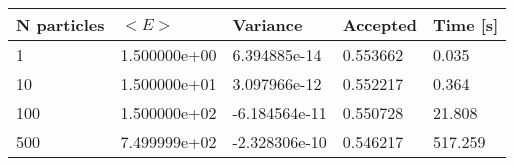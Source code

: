 \begin{table}[h!]
\begin{tabular}{|l|l|l|l|l|}
\hline 
N particles & $<E>$ & Variance & Accepted & Time [s]\\ 
 \hline 
1 & 1.500000e+00 & 6.394885e-14 & 0.553662 & 0.035 \\ \hline 
10 & 1.500000e+01 & 3.097966e-12 & 0.552217 & 0.364 \\ \hline 
100 & 1.500000e+02 & -6.184564e-11 & 0.550728 & 21.808 \\ \hline 
500 & 7.499999e+02 & -2.328306e-10 & 0.546217 & 517.259 \\ \hline 
\end{tabular}
\label{tab:hn3} 
\end{table} 
